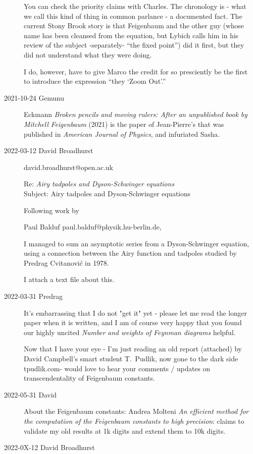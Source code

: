 \begin{description}
You can check the priority claims with Charles. The chronology is - what
we call this kind of thing in common parlance - a documented fact. The
current Stony Brook story is that Feigenbaum and the other guy (whose
name has been cleansed from the equation, but Lybich calls him in his
review of the subject -separately- ``the fixed point'') did it first, but
they did not understand what they were doing.

I do, however, have to give Marco the credit for so presciently be the
first to introduce the expression ``they  `Zoom Out'.''

\item[2021-10-24 Gemunu]
Eckmann
{\em Broken pencils and moving rulers: {After} an unpublished book by
{Mitchell Feigenbaum}} (2021)
is the paper of Jean-Pierre's that was published in \emph{American
Journal of Physics}, and infuriated Sasha.

\item[2022-03-12 David Broadhurst] david.broadhurst@open.ac.uk

Re: {\em Airy tadpoles and Dyson-Schwinger equations}
\\
Subject: Airy tadpoles and Dyson-Schwinger equations

Following work by

{Paul Balduf} paul.balduf@physik.hu-berlin.de,

I managed to sum an asymptotic series from
a Dyson-Schwinger equation, using a connection between the Airy function
and tadpoles studied by Predrag Cvitanovi{\'c} in 1978.

I attach a text file about this.

\item[2022-03-31 Predrag]
It's embarrassing that I do not "get it" yet - please let me read the
longer paper when it is written, and I am of course very happy that you
found our highly uncited
{\em Number and weights of Feynman diagrams}
helpful.

Now that I have your eye - I'm just reading an old report (attached) by
David Campbell's smart student T.~Pudlik, now gone to the dark side
 {tpudlik.com}- would love to hear your
comments / updates on transcendentality of Feigenbaum constants.

\item[2022-05-31 David]
About the Feigenbaum constants:
Andrea Molteni {\em An efficient method for the computation of the
Feigenbaum constants to high precision}: 
claims to validate my old results at 1k digits and extend them to 10k digits.


\item[2022-0X-12 David Broadhurst]

\end{description}



\printbibliography[heading=subbibintoc,title={References}]
